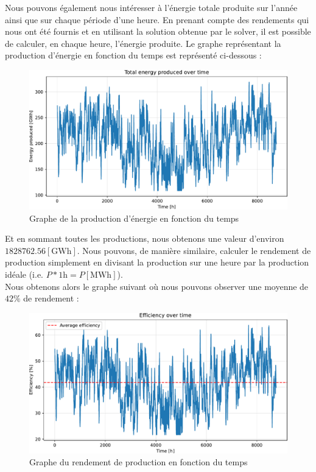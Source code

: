 \documentclass{article}
\newlength{\temp}
\begin{document}
Nous pouvons également nous intéresser à l'énergie totale produite sur l'année ainsi que sur chaque période d'une heure.
En prenant compte des rendements qui nous ont été fournis et en utilisant la solution obtenue par le solver,
il est possible de calculer, en chaque heure, l'énergie produite. Le graphe représentant la production d'énergie en fonction du temps est représenté ci-dessous :

\begin{figure}[h!]
    \centering
    \includegraphics[scale=0.5]{Images/Partie_1/Q1/energy_produced.pdf}
    \caption{Graphe de la production d'énergie en fonction du temps}
    \label{fig:energy_produced_partie1}
\end{figure}
Et en sommant toutes les productions, nous obtenons une valeur d'environ $1828762.56 [\mathrm{GWh}]$. 
\newpage
Nous pouvons, de manière similaire, calculer le rendement de production simplement en divisant la production sur une heure par la production idéale (i.e. $P*1\mathrm{h} = P [\mathrm{MWh}]$).\\
Nous obtenons alors le graphe suivant où nous pouvons observer une moyenne de $42\%$ de rendement :

\begin{figure}[h!]
    \centering
    \includegraphics[scale=0.5]{Images/Partie_1/Q1/efficiency.pdf}
    \caption{Graphe du rendement de production en fonction du temps}
    \label{fig:efficiency_partie1}
\end{figure}
\end{document}
